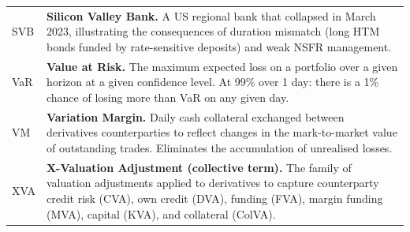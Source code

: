 \documentclass[12pt,a4paper]{article}
\begin{document}
\begin{longtable}{p{3.2cm} p{10.8cm}}
  SVB   & \textbf{Silicon Valley Bank.}
          A US regional bank that collapsed in March 2023, illustrating the
          consequences of duration mismatch (long HTM bonds funded by
          rate-sensitive deposits) and weak NSFR management. \\[4pt]

  VaR   & \textbf{Value at Risk.}
          The maximum expected loss on a portfolio over a given horizon at a
          given confidence level.  At 99\% over 1 day: there is a 1\% chance
          of losing more than VaR on any given day. \\[4pt]

  VM    & \textbf{Variation Margin.}
          Daily cash collateral exchanged between derivatives counterparties
          to reflect changes in the mark-to-market value of outstanding trades.
          Eliminates the accumulation of unrealised losses. \\[4pt]

  XVA   & \textbf{X-Valuation Adjustment (collective term).}
          The family of valuation adjustments applied to derivatives to
          capture counterparty credit risk (CVA), own credit (DVA), funding
          (FVA), margin funding (MVA), capital (KVA), and collateral (ColVA). \\

\end{longtable}
\end{document}
